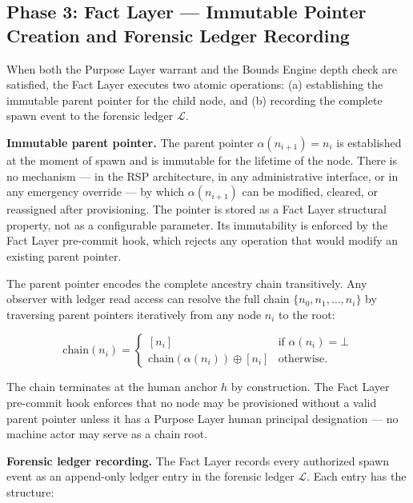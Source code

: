\subsection{Phase 3: Fact Layer — Immutable Pointer Creation and Forensic Ledger Recording}
\label{sec:rs-phase3}

When both the Purpose Layer warrant and the Bounds Engine depth check are satisfied, the Fact Layer executes two atomic operations: (a) establishing the immutable parent pointer for the child node, and (b) recording the complete spawn event to the forensic ledger $\mathcal{L}$.

\medskip
\noindent\textbf{Immutable parent pointer.} The parent pointer $\alpha(n_{i+1}) = n_i$ is established at the moment of spawn and is immutable for the lifetime of the node. There is no mechanism — in the RSP architecture, in any administrative interface, or in any emergency override — by which $\alpha(n_{i+1})$ can be modified, cleared, or reassigned after provisioning. The pointer is stored as a Fact Layer structural property, not as a configurable parameter. Its immutability is enforced by the Fact Layer pre-commit hook, which rejects any operation that would modify an existing parent pointer.

The parent pointer encodes the complete ancestry chain transitively. Any observer with ledger read access can resolve the full chain $\{n_0, n_1, \dots, n_i\}$ by traversing parent pointers iteratively from any node $n_i$ to the root:

\begin{equation}
\text{chain}(n_i) = 
\begin{cases}
[n_i] & \text{if } \alpha(n_i) = \bot \\[4pt]
\text{chain}(\alpha(n_i)) \oplus [n_i] & \text{otherwise}.
\end{cases}
\label{eq:ancestry-chain}
\end{equation}

The chain terminates at the human anchor $h$ by construction. The Fact Layer pre-commit hook enforces that no node may be provisioned without a valid parent pointer unless it has a Purpose Layer human principal designation — no machine actor may serve as a chain root.

\medskip
\noindent\textbf{Forensic ledger recording.} The Fact Layer records every authorized spawn event as an append-only ledger entry in the forensic ledger $\mathcal{L}$. Each entry has the structure:

